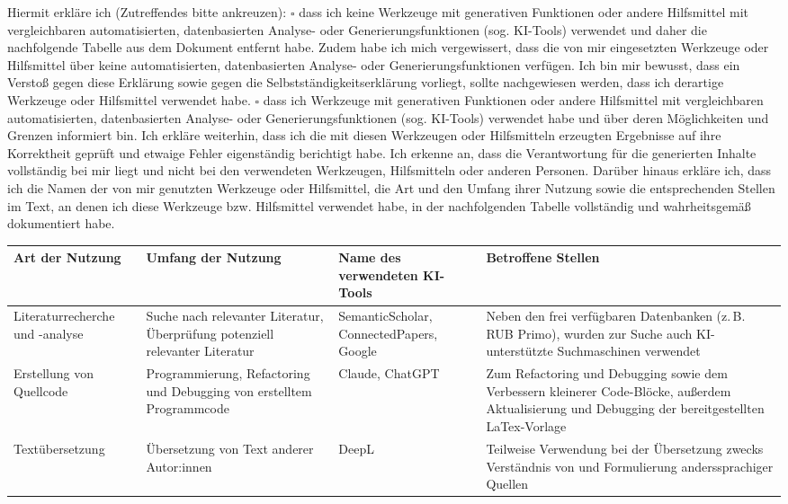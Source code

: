 Hiermit erkläre ich (Zutreffendes bitte ankreuzen):
\smallbreak
$\square$ \;
dass ich keine Werkzeuge mit generativen Funktionen oder andere
Hilfsmittel mit vergleichbaren automatisierten, datenbasierten
Analyse- oder Generierungsfunktionen (sog. KI-Tools) verwendet und
daher die nachfolgende Tabelle aus dem Dokument entfernt habe.
Zudem habe ich mich vergewissert, dass die von mir eingesetzten
Werkzeuge oder Hilfsmittel über keine automatisierten, datenbasierten
Analyse- oder Generierungsfunktionen verfügen.
Ich bin mir bewusst, dass ein Verstoß gegen diese Erklärung sowie
gegen die Selbstständigkeitserklärung vorliegt, sollte nachgewiesen
werden, dass ich derartige Werkzeuge oder Hilfsmittel verwendet habe.
\smallbreak
$\square$ \;
dass ich Werkzeuge mit generativen Funktionen oder andere Hilfsmittel
mit vergleichbaren automatisierten, datenbasierten Analyse- oder
Generierungsfunktionen (sog. KI-Tools) verwendet habe und über deren
Möglichkeiten und Grenzen informiert bin.
Ich erkläre weiterhin, dass ich die mit diesen Werkzeugen oder
Hilfsmitteln erzeugten Ergebnisse auf ihre Korrektheit geprüft und
etwaige Fehler eigenständig berichtigt habe.
Ich erkenne an, dass die Verantwortung für die generierten Inhalte
vollständig bei mir liegt und nicht bei den verwendeten Werkzeugen,
Hilfsmitteln oder anderen Personen.
Darüber hinaus erkläre ich, dass ich die Namen der von mir genutzten
Werkzeuge oder Hilfsmittel, die Art und den Umfang ihrer Nutzung
sowie die entsprechenden Stellen im Text, an denen ich diese
Werkzeuge bzw. Hilfsmittel verwendet habe, in der nachfolgenden
Tabelle vollständig und wahrheitsgemäß dokumentiert habe.
\bigbreak

\fontsize{10}{10}\selectfont
\renewcommand{\arraystretch}{1.2}
\setlength{\tabcolsep}{6pt}

\begin{tabularx}{\textwidth}{|p{2cm}|p{4cm}|p{2.8cm}|X|}
  \hline
  \textbf{Art der \newline Nutzung} &
  \textbf{Umfang der Nutzung} &
  \textbf{Name des verwendeten KI-Tools}
  & \textbf{Betroffene Stellen} \\
  \hline
  Literaturrecherche und -analyse
  & Suche nach relevanter Literatur, Überprüfung potenziell
  relevanter Literatur
  & SemanticScholar, ConnectedPapers, Google
  & Neben den frei verfügbaren Datenbanken (z.\,B. RUB Primo), wurden zur Suche
  auch KI-unterstützte Suchmaschinen verwendet\\
  \hline
  Erstellung von Quellcode & Programmierung, Refactoring und
  Debugging von erstelltem Programmcode
  & Claude, ChatGPT
  & Zum Refactoring und Debugging sowie dem Verbessern kleinerer Code-Blöcke,
  außerdem Aktualisierung und Debugging der bereitgestellten LaTex-Vorlage\\
  \hline
  Textübersetzung
  & Übersetzung von Text anderer Autor:innen
  & DeepL
  & Teilweise Verwendung bei der Übersetzung zwecks Verständnis
  von und Formulierung
  anderssprachiger Quellen \\
  \hline
\end{tabularx}

